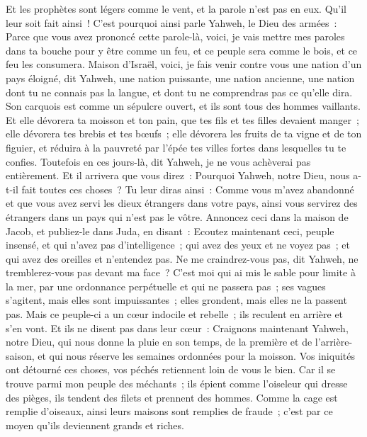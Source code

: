 \begin{multicols}{2}
Et les prophètes sont légers comme le vent, et la parole n'est pas en eux. Qu'il leur soit fait ainsi~!
C'est pourquoi ainsi parle Yahweh, le Dieu des armées~: Parce que vous avez prononcé cette parole-là, voici, je vais mettre mes paroles dans ta bouche pour y être comme un feu, et ce peuple sera comme le bois, et ce feu les consumera.
Maison d'Israël, voici, je fais venir contre vous une nation d'un pays éloigné, dit Yahweh, une nation puissante, une nation ancienne, une nation dont tu ne connais pas la langue, et dont tu ne comprendras pas ce qu'elle dira.
Son carquois est comme un sépulcre ouvert, et ils sont tous des hommes vaillants.
Et elle dévorera ta moisson et ton pain, que tes fils et tes filles devaient manger~; elle dévorera tes brebis et tes bœufs~; elle dévorera les fruits de ta vigne et de ton figuier, et réduira à la pauvreté par l'épée tes villes fortes dans lesquelles tu te confies.
Toutefois en ces jours-là, dit Yahweh, je ne vous achèverai pas entièrement.
Et il arrivera que vous direz~: Pourquoi Yahweh, notre Dieu, nous a-t-il fait toutes ces choses~? Tu leur diras ainsi~: Comme vous m'avez abandonné et que vous avez servi les dieux étrangers dans votre pays, ainsi vous servirez des étrangers dans un pays qui n'est pas le vôtre.
Annoncez ceci dans la maison de Jacob, et publiez-le dans Juda, en disant~:
Ecoutez maintenant ceci, peuple insensé, et qui n'avez pas d'intelligence~; qui avez des yeux et ne voyez pas~; et qui avez des oreilles et n'entendez pas.
Ne me craindrez-vous pas, dit Yahweh, ne tremblerez-vous pas devant ma face~? C'est moi qui ai mis le sable pour limite à la mer, par une ordonnance perpétuelle et qui ne passera pas~; ses vagues s'agitent, mais elles sont impuissantes~; elles grondent, mais elles ne la passent pas.
Mais ce peuple-ci a un cœur indocile et rebelle~; ils reculent en arrière et s'en vont.
Et ils ne disent pas dans leur cœur~: Craignons maintenant Yahweh, notre Dieu, qui nous donne la pluie en son temps, de la première et de l'arrière-saison, et qui nous réserve les semaines ordonnées pour la moisson.
Vos iniquités ont détourné ces choses, vos péchés retiennent loin de vous le bien.
Car il se trouve parmi mon peuple des méchants~; ils épient comme l'oiseleur qui dresse des pièges, ils tendent des filets et prennent des hommes.
Comme la cage est remplie d'oiseaux, ainsi leurs maisons sont remplies de fraude~; c'est par ce moyen qu'ils deviennent grands et riches.

\end{multicols}
